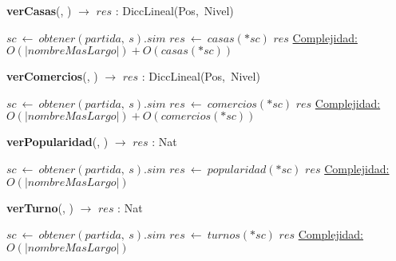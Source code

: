 \begin{Algoritmos}
    \begin{algorithm}[H]{\textbf{verCasas}(, ) $\to$ $res$ : DiccLineal(Pos,\ Nivel)}
    \begin{algorithmic}[1]
        \State $sc\ \leftarrow\ obtener(partida,\ s).sim$
        \State $res\ \leftarrow\ casas(*sc)$
        \State \Return $res$
        \medskip
        \Statex \underline{Complejidad:} $O(|nombreMasLargo|) + O(casas(*sc))$
    \end{algorithmic}
    \end{algorithm}

    \begin{algorithm}[H]{\textbf{verComercios}(, ) $\to$ $res$ : DiccLineal(Pos,\ Nivel)}
    \begin{algorithmic}[1]
        \State $sc\ \leftarrow\ obtener(partida,\ s).sim$
        \State $res\ \leftarrow\ comercios(*sc)$
        \State \Return $res$
        \medskip
        \Statex \underline{Complejidad:} $O(|nombreMasLargo|) + O(comercios(*sc))$
    \end{algorithmic}
    \end{algorithm}

    \begin{algorithm}[H]{\textbf{verPopularidad}(, ) $\to$ $res$ : Nat}
    \begin{algorithmic}[1]
        \State $sc\ \leftarrow\ obtener(partida,\ s).sim$
        \State $res\ \leftarrow\ popularidad(*sc)$
        \State \Return $res$
        \medskip
        \Statex \underline{Complejidad:} $O(|nombreMasLargo|)$
    \end{algorithmic}
    \end{algorithm}

    \begin{algorithm}[H]{\textbf{verTurno}(, ) $\to$ $res$ : Nat}
    \begin{algorithmic}[1]
        \State $sc\ \leftarrow\ obtener(partida,\ s).sim$
        \State $res\ \leftarrow\ turnos(*sc)$
        \State \Return $res$
        \medskip
        \Statex \underline{Complejidad:} $O(|nombreMasLargo|)$
    \end{algorithmic}
    \end{algorithm}

\end{Algoritmos}
